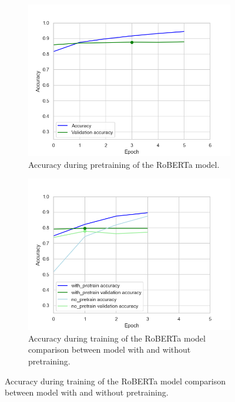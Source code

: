 \documentclass[acmsmall,nonacm]{acmart}
\begin{document}
\begin{figure}[H] 
  \begin{subfigure}[b]{0.4\linewidth}
    \includegraphics[width=\textwidth]{assets/roberta-base_accuracy.png}
    \caption{Accuracy during pretraining of the RoBERTa model.}
    \label{fig:roberta_model_pretrain}
    \vspace{2ex}
  \end{subfigure}%
  \hfill
  \begin{subfigure}[b]{0.4\linewidth}
    \includegraphics[width=\textwidth]{assets/roberta-base_comparison_with_pretrain_no_pretrain.png}
      \caption{Accuracy during training of the RoBERTa model comparison between model with and without pretraining.}

\end{subfigure}
\end{figure}
\end{document}
